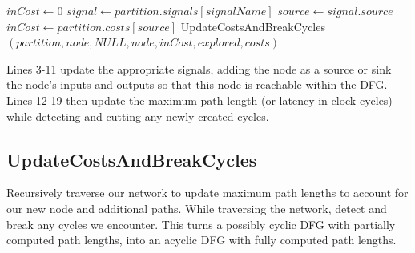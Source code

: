 \documentclass[12pt,final,oneside]{dwThesis} %
\begin{document}
\begin{algorithm}
\begin{algorithmic}[1]
         \State $inCost \gets 0$
         \State $signal \gets partition.signals[signalName]$
         \State $source \gets signal.source$
         \State $inCost \gets partition.costs[source]$
         \EndIf
         \EndFor
         \State UpdateCostsAndBreakCycles$(partition, node, NULL, node, inCost, explored, costs)$
         \EndProcedure
      \end{algorithmic}
   \end{algorithm}
   Lines 3-11 update the appropriate signals, adding the node as a source or sink the node's inputs and outputs so that this node is reachable within the \ac{DFG}.
   Lines 12-19 then update the maximum path length (or latency in clock cycles) while detecting and cutting any newly created cycles.


   \newpage
   \subsection{UpdateCostsAndBreakCycles}
   Recursively traverse our network to update maximum path lengths to account for our new node and additional paths. While traversing the network, detect and break any cycles we encounter.
   This turns a possibly cyclic \ac{DFG} with partially computed path lengths, into an acyclic \ac{DFG} with fully computed path lengths.
\end{document}
